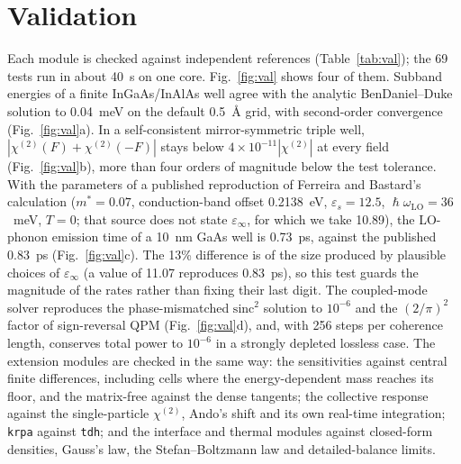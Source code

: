 \documentclass[11pt]{article}
\newcommand{\chitwo}{\chi^{(2)}}
\newcommand{\code}[1]{\texttt{#1}}
\begin{document}
\section{Validation}
Each module is checked against independent references (Table~\ref{tab:val}); the 69 tests run in about 40~s on one core. Fig.~\ref{fig:val} shows four of them. Subband energies of a finite InGaAs/InAlAs well agree with the analytic BenDaniel--Duke solution to 0.04~meV on the default 0.5~\AA{} grid, with second-order convergence (Fig.~\ref{fig:val}a). In a self-consistent mirror-symmetric triple well, $|\chitwo(F)+\chitwo(-F)|$ stays below $4\times10^{-11}|\chitwo|$ at every field (Fig.~\ref{fig:val}b), more than four orders of magnitude below the test tolerance. With the parameters of a published reproduction of Ferreira and Bastard's calculation \cite{Ferreira1989,nextnanoBench} ($m^*=0.07$, conduction-band offset 0.2138~eV, $\varepsilon_s=12.5$, $\hslash\omega_\mathrm{LO}=36$~meV, $T=0$; that source does not state $\varepsilon_\infty$, for which we take 10.89), the LO-phonon emission time of a 10~nm GaAs well is 0.73~ps, against the published 0.83~ps (Fig.~\ref{fig:val}c). The 13\% difference is of the size produced by plausible choices of $\varepsilon_\infty$ (a value of 11.07 reproduces 0.83~ps), so this test guards the magnitude of the rates rather than fixing their last digit. The coupled-mode solver reproduces the phase-mismatched $\mathrm{sinc}^2$ solution to $10^{-6}$ and the $(2/\pi)^2$ factor of sign-reversal QPM (Fig.~\ref{fig:val}d), and, with 256 steps per coherence length, conserves total power to $10^{-6}$ in a strongly depleted lossless case. The extension modules are checked in the same way: the sensitivities against central finite differences, including cells where the energy-dependent mass reaches its floor, and the matrix-free against the dense tangents; the collective response against the single-particle $\chitwo$, Ando's shift and its own real-time integration; \code{krpa} against \code{tdh}; and the interface and thermal modules against closed-form densities, Gauss's law, the Stefan--Boltzmann law and detailed-balance limits.
\end{document}
